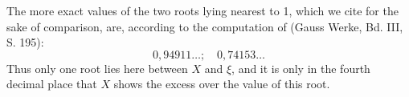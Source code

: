 
The more exact values of the two roots lying nearest to 1, which we cite for the sake of comparison, are, according to the computation of  (Gauss Werke, Bd. III, S. 195):
\[
0,94911 \ldots; \quad 0,74153 \ldots
\]
Thus only one root lies here between $X$ and $\xi$, and it is only in the fourth decimal place that $X$ shows the excess over the value of this root.
